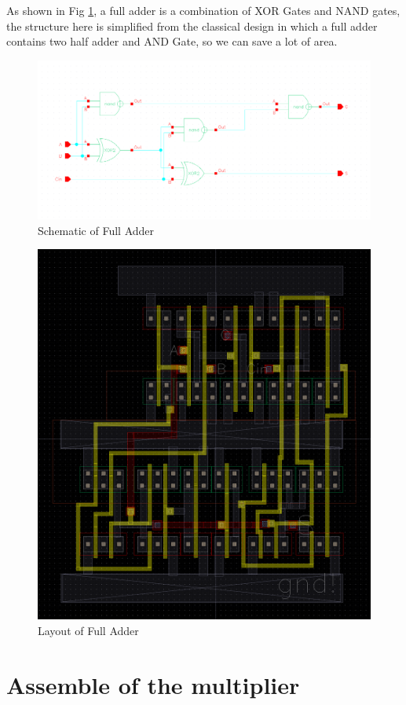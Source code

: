 \documentclass[conference]{IEEEtran}
\begin{document}

As shown in Fig \ref{Schematic of Full Adder}, a full adder is a combination of XOR Gates and NAND gates, the structure here is simplified from the classical design in which a full adder contains two half adder and AND Gate, so we can save a lot of area.

\begin{figure}[H]
    \centering
    \includegraphics[width = 0.9\linewidth]{full_adder_schematic.png}
    \caption{Schematic of Full Adder}
    \label{Schematic of Full Adder}
\end{figure}
 
\begin{figure}[H]
    \centering
    \includegraphics[width = 0.5\linewidth]{full_adder_layout.png}
    \caption{Layout of Full Adder}
    \label{Layout of Full Adder}
\end{figure}


\section{Assemble of the multiplier}
\label{Assemble}
\end{document}

